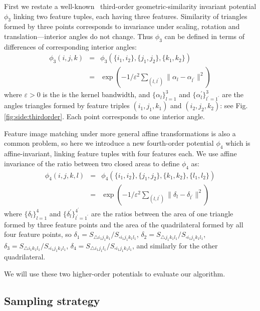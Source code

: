 First we restate a well-known~\cite{Duchenne_etal09,Chertok10} third-order geometric-similarity invariant potential $\phi_3$ linking two feature tuples, each having three features.
Similarity of triangles formed by three points corresponds to invariance under scaling, rotation and translation---interior angles do not change.
Thus $\phi_3$ can be defined in terms of differences of corresponding interior angles:
%
\begin{eqnarray}
\phi_3(i,j,k)&=&\phi_3(\{i_1,i_2\}, \{j_1,j_2\}, \{k_1,k_2\})\nonumber\\
&=&\exp(-1/\varepsilon^2\sum\nolimits_{(l,l^{'})}\lVert \alpha_l- \alpha_{l^{'} } \lVert^2 )
\end{eqnarray}
where $\varepsilon > 0$ is the is the kernel bandwidth, and $\{\alpha_l\}_{l=1}^3$  and $\{\alpha_l^{'}\}_{l^{'}=1^{'}}^{3}$ are the angles triangles formed by feature triples $(i_1,j_1,k_1)$ and $(i_2,j_2,k_2)$: see Fig.\ref{fig:side:thirdorder}. Each point corresponds to one interior angle.
%

Feature image matching under  more general affine transformations is also a common problem,
so here we introduce a new fourth-order potential $\phi_4$ which is affine-invariant, linking feature tuples with four features each.
We use affine invariance of the ratio between two closed areas to define $\phi_4$ as:
%
\begin{eqnarray}
\phi_4(i,j,k,l)&=&\phi_4(\{i_1,i_2\}, \{j_1,j_2\}, \{k_1,k_2\}, \{l_1,l_2\}) \nonumber \\
&=&\exp(-1/\varepsilon^2\sum\nolimits_{(l,l^{'})}\lVert \delta_l- \delta_{l^{'} } \lVert^2 )
\end{eqnarray}
where $\{\delta_l\}_{l=1}^4$  and $\{\delta_l^{'}\}_{l^{'}=1^{'}}^{4^{'}}$ are the ratios between the area of one triangle formed by three feature points and the area of the quadrilateral formed by all four feature points, so
$\delta_1=S_{\triangle i_1 j_1 k_1}/S_{\square i_1 j_1 k_1 l_1}$, $\delta_2=S_{\triangle j_1 k_1 l_1}/S_{\square i_1 j_1 k_1 l_1}$, $\delta_3=S_{\triangle i_1 k_1 l_1}/S_{\square i_1 j_1 k_1 l_1}$, $\delta_4=S_{\triangle i_1 j_1 l_1}/S_{\square i_1 j_1 k_1 l_1}$,
and similarly for the other quadrilateral.

We will use these two higher-order potentials to evaluate our algorithm.

\subsection{Sampling strategy}
\label{subsec:sampling}

